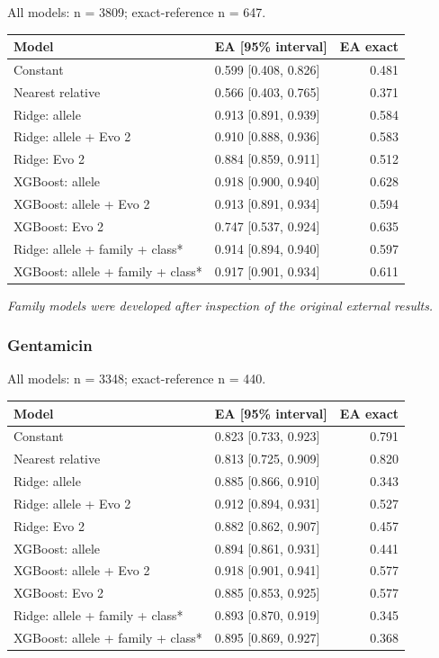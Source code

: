 \documentclass[
  10pt,
]{article}
\newcounter{none} %
\begin{document}
All models: n = 3809; exact-reference n = 647.

{\def\LTcaptype{none} %
\begin{longtable}[]{@{}llr@{}}
\toprule\noalign{}
Model & EA {[}95\% interval{]} & EA exact \\
\midrule\noalign{}
\endhead
\bottomrule\noalign{}
\endlastfoot
Constant & 0.599 {[}0.408, 0.826{]} & 0.481 \\
Nearest relative & 0.566 {[}0.403, 0.765{]} & 0.371 \\
Ridge: allele & 0.913 {[}0.891, 0.939{]} & 0.584 \\
Ridge: allele + Evo 2 & 0.910 {[}0.888, 0.936{]} & 0.583 \\
Ridge: Evo 2 & 0.884 {[}0.859, 0.911{]} & 0.512 \\
XGBoost: allele & 0.918 {[}0.900, 0.940{]} & 0.628 \\
XGBoost: allele + Evo 2 & 0.913 {[}0.891, 0.934{]} & 0.594 \\
XGBoost: Evo 2 & 0.747 {[}0.537, 0.924{]} & 0.635 \\
Ridge: allele + family + class* & 0.914 {[}0.894, 0.940{]} & 0.597 \\
XGBoost: allele + family + class* & 0.917 {[}0.901, 0.934{]} & 0.611 \\
\end{longtable}
}

\emph{Family models were developed after inspection of the original
external results.}

\subsubsection{Gentamicin}\label{gentamicin-2}

All models: n = 3348; exact-reference n = 440.

{\def\LTcaptype{none} %
\begin{longtable}[]{@{}llr@{}}
\toprule\noalign{}
Model & EA {[}95\% interval{]} & EA exact \\
\midrule\noalign{}
\endhead
\bottomrule\noalign{}
\endlastfoot
Constant & 0.823 {[}0.733, 0.923{]} & 0.791 \\
Nearest relative & 0.813 {[}0.725, 0.909{]} & 0.820 \\
Ridge: allele & 0.885 {[}0.866, 0.910{]} & 0.343 \\
Ridge: allele + Evo 2 & 0.912 {[}0.894, 0.931{]} & 0.527 \\
Ridge: Evo 2 & 0.882 {[}0.862, 0.907{]} & 0.457 \\
XGBoost: allele & 0.894 {[}0.861, 0.931{]} & 0.441 \\
XGBoost: allele + Evo 2 & 0.918 {[}0.901, 0.941{]} & 0.577 \\
XGBoost: Evo 2 & 0.885 {[}0.853, 0.925{]} & 0.577 \\
Ridge: allele + family + class* & 0.893 {[}0.870, 0.919{]} & 0.345 \\
XGBoost: allele + family + class* & 0.895 {[}0.869, 0.927{]} & 0.368 \\
\end{longtable}
}
\end{document}
